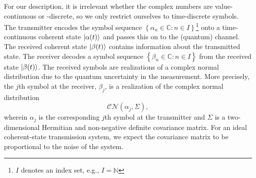 For our description, it is irrelevant whether the complex numbers are value-continuous or -discrete, so we only restrict ourselves to time-discrete symbols.
The transmitter encodes the symbol sequence $\left\{\alpha_n\in\mathbb{C}\colon n\in I\right\}$\footnote{$I$ denotes an index set, e.g., $I=\mathbb{N}$} onto a time-continuous coherent state $\lvert\alpha(t)\rangle$ and passes this on to the (quantum) channel.
The received coherent state $\lvert\beta(t)\rangle$ contains information about the transmitted state.
The receiver decodes a symbol sequence $\left\{\beta_n\in\mathbb{C}\colon n\in I\right\}$ from the received state $\lvert\beta(t)\rangle$.
The received symbols are realizations of a complex normal distribution due to the quantum uncertainty in the measurement.
More precisely, the $j$th symbol at the receiver, $\beta_j$, is a realization of the complex normal distribution
\begin{equation*}
	\mathcal{CN}\left(
		\alpha_j,
		\Sigma
	\right),
\end{equation*}
wherein $\alpha_j$ is the corresponding $j$th symbol at the transmitter and $\Sigma$ is a two-dimensional Hermitian and non-negative definite covariance matrix.
For an ideal coherent-state transmission system, we expect the covariance matrix to be proportional to the noise of the system.